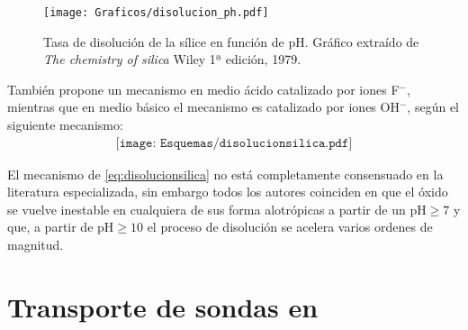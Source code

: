 			\begin{figure}[th!]
			    \texttt{[image: Graficos/disolucion\_ph.pdf]}
	       		\caption[Tasa de disolución sílice en función del pH]{Tasa de disolución de la sílice en función de pH. Gráfico extraído de \textit{The chemistry of silica} Wiley 1ª edición, 1979.\cite{iler1979}}
	         	\label{fig:disolucion_ph}
	     		\end{figure}
	
	También propone un mecanismo en medio ácido catalizado por iones F$^-$, mientras que en medio básico el mecanismo es catalizado por iones OH$^-$, según el siguiente mecanismo:
			\begin{equation}
				\begin{aligned}
				\texttt{[image: Esquemas/disolucionsilica.pdf]}
				\label{eq:disolucionsilica}
				\end{aligned}
				\end{equation} 
	
	El mecanismo de \ref{eq:disolucionsilica} no está completamente consensuado en la literatura especializada, sin embargo todos los autores coinciden en que el óxido se vuelve inestable en cualquiera de sus forma alotrópicas a partir de un $\text{pH}\geq7$ y que, a partir de $\text{pH}\geq10$ el proceso de disolución se acelera varios ordenes de magnitud.\cite{Kosmulski2002,Kosmulski2014,Schwarz1984,Si-HanWu2013,iler1979}

	
				

\section{Transporte de sondas en \pdm}

